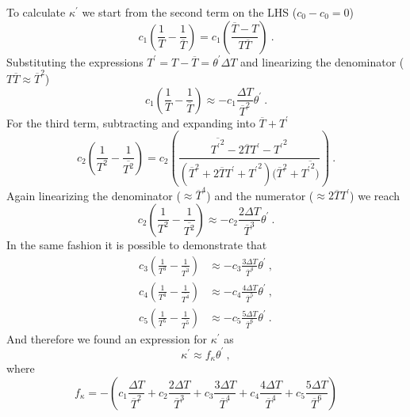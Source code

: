 \documentclass[10pt]{article}
\def\lp{\left(}
\def\rp{\right)}
\def\tr{{\theta^\prime}}
\begin{document}
To calculate $\kappa^\prime$ we start from the second term on the LHS ($c_0 - c_0 = 0$)
\begin{equation*}
c_1 \lp \frac{1}{T} - \frac{1}{\overline{T}} \rp = c_1 \lp \frac{\overline{T} - T}{T\overline{T}} \rp \ .
\end{equation*}
Substituting the expressions $T^\prime  = T - \overline{T} = \theta^\prime \Delta T$ and linearizing the denominator ($T\overline{T} \approx \overline{T}^2$)
\begin{equation*}
c_1 \lp \frac{1}{T} - \frac{1}{\overline{T}} \rp \approx - c_1 \frac{\Delta T}{\overline{T}^2} \tr \ .
\end{equation*}
For the third term, subtracting and expanding into $\overline{T}+T^\prime$
\begin{equation*}
c_2 \lp \frac{1}{T^2} - \frac{1}{\overline{T^2}} \rp = c_2 \lp \frac{\overline{{T^\prime}^2} - 2\overline{T}{T^\prime} - {T^\prime}^2}{(\overline{T}^2 + 2\overline{T}T^\prime + {T^\prime}^2)(\overline{T}^2 + \overline{{T^\prime}^2)}} \rp \ .
\end{equation*}
Again linearizing the denominator ($\approx \overline{T}^4$) and the numerator ($\approx 2\overline{T}T^\prime$) we reach
\begin{equation*}
c_2 \lp \frac{1}{T^2} - \frac{1}{\overline{T^2}} \rp \approx - c_2  \frac{2\Delta T}{\overline{T}^3} \tr \ .
\end{equation*}
In the same fashion it is possible to demonstrate that 
\begin{equation*}
\begin{split}
c_3 \lp \frac{1}{T^3} - \frac{1}{\overline{T^3}} \rp & \approx - c_3  \frac{3\Delta T}{\overline{T}^4} \tr \ ,\\
c_4 \lp \frac{1}{T^4} - \frac{1}{\overline{T^4}} \rp & \approx - c_4  \frac{4\Delta T}{\overline{T}^5} \tr \ ,\\
c_5 \lp \frac{1}{T^5} - \frac{1}{\overline{T^5}} \rp & \approx - c_5  \frac{5\Delta T}{\overline{T}^6} \tr \ .
\end{split}
\end{equation*}
And therefore we found an expression for $\kappa^\prime$ as
\begin{equation*}
\kappa^\prime \approx f_{\kappa} \theta^\prime \ ,
\end{equation*}
where
\begin{equation*}
f_{\kappa} =  - \lp c_1  \frac{\Delta T}{\overline{T}^2} + c_2  \frac{2\Delta T}{\overline{T}^3} + c_3  \frac{3\Delta T}{\overline{T}^4} +  c_4  \frac{4\Delta T}{\overline{T}^4} +  c_5  \frac{5\Delta T}{\overline{T}^6} \rp
\end{equation*}
\end{document}
